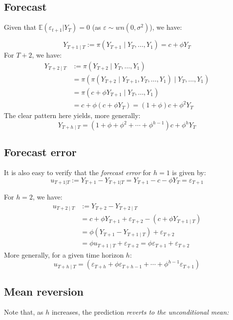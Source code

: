 \documentclass[11pt, a4paper]{report}
\theoremstyle{plain}
\theoremstyle{plain}
\theoremstyle{remark}
\begin{document}
\subsection{Forecast}

Given that $\mathbb{E}(\varepsilon_{t+1}|Y_T) = 0$ (as $\varepsilon \sim wn(0, \sigma^2)$), we have: 

$$
Y_{T+1 \mid T}:=\pi\left(Y_{T+1} \mid Y_{T}, \ldots, Y_{1}\right)=c+\phi Y_{T}
$$
For $T+2$, we have:
$$
\begin{aligned}
	Y_{T+2 \mid T} &:=\pi\left(Y_{T+2} \mid Y_{T}, \ldots, Y_{1}\right) \\
	&=\pi\left(\pi\left(Y_{T+2} \mid Y_{T+1}, Y_{T}, \ldots, Y_{1}\right) \mid Y_{T}, \ldots, Y_{1}\right) \\
	&=\pi\left(c+\phi Y_{T+1} \mid Y_{T}, \ldots, Y_{1}\right) \\
	&=c+\phi\left(c+\phi Y_{T}\right)=(1+\phi) c+\phi^{2} Y_{T}
\end{aligned}
$$
The clear pattern here yields, more generally:
$$
Y_{T+h \mid T}=\left(1+\phi+\phi^{2}+\cdots+\phi^{h-1}\right) c+\phi^{h} Y_{T}
$$

\subsection{Forecast error}

It is also easy to verify that the \textit{forecast error} for $h=1$ is given by:
$$ u_{T+1|T} := Y_{T+1} - Y_{T+1|T} = Y_{T+1} - c - \phi Y_T = \varepsilon_{T+1} $$
 
For $h=2$, we have:
$$
\begin{aligned}
 u_{T+2 \mid T} &:=Y_{T+2}-Y_{T+2 \mid T} \\
 &=c+\phi Y_{T+1}+\varepsilon_{T+2}-\left(c+\phi Y_{T+1 \mid T}\right) \\
 &=\phi\left(Y_{T+1}-Y_{T+1 \mid T}\right)+\varepsilon_{T+2} \\
 &=\phi u_{T+1 \mid T}+\varepsilon_{T+2}=\phi \varepsilon_{T+1}+\varepsilon_{T+2}
\end{aligned}
$$
More generally, for a given time horizon $h$:
$$
u_{T+h \mid T}=\left(\varepsilon_{T+h}+\phi \varepsilon_{T+h-1}+\cdots+\phi^{h-1} \varepsilon_{T+1}\right)$$

\subsection{Mean reversion}

Note that, as $h$ increases, the prediction \textit{reverts to the unconditional mean:}
\end{document}
